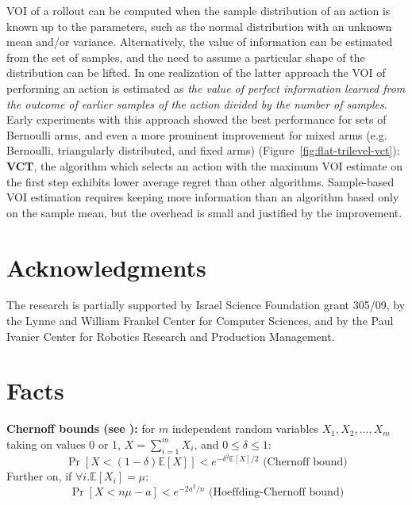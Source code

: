 \documentclass{article}
\newcommand {\IE} {\ensuremath {\mathbb{E}}}
\begin{document}
VOI of a rollout can be computed when the sample distribution of an
action is known up to the parameters, such as the normal distribution
with an unknown mean and/or variance. Alternatively, the value of
information can be estimated from the set of samples, and the need to
assume a particular shape of the distribution can be lifted. In one
realization of the latter approach the VOI of performing an action is
estimated as \emph{the value of perfect information learned from the outcome
of earlier samples of the action divided by the number of
samples}. Early experiments with this approach showed the best
performance for sets of Bernoulli arms, and even a more prominent
improvement for mixed arms (e.g. Bernoulli, triangularly distributed,
and fixed arms) (Figure~\ref{fig:flat-trilevel-vct}):
\textbf{VCT}, the algorithm which selects an action with the maximum VOI estimate on
the first step exhibits lower average regret than other algorithms.
Sample-based VOI estimation requires keeping more information than an
algorithm based only on the sample
mean, but the overhead is small and justified by the improvement.

\section*{Acknowledgments}

The research is partially supported by Israel
Science Foundation grant 305/09, by the Lynne and William Frankel
Center for Computer Sciences, and by the Paul Ivanier Center for
Robotics Research and Production Management.

\clearpage
\appendix

\section{Facts}

{\bf Chernoff bounds (see \cite{Hagerup.chernoff}):} for $m$ independent random variables $X_1, X_2, ..., X_m$
taking on values 0 or 1, $X=\sum_{i=1}^m X_i$, and $0\le\delta\le 1$:
\begin{equation}
\Pr[X < (1-\delta)\IE[X]] < e^{-\delta^2\IE[X]/2} \mbox{ (Chernoff bound)}
\label{eq:chernoff-bound}
\end{equation}
Further on, if $\forall i. \IE[X_i]=\mu$:
\begin{equation}
\Pr[X < n\mu-a] <  e^{-2a^2/n}
\label{eq:chernoff-hoeffding-bound} \mbox{ (Hoeffding-Chernoff bound)}
\end{equation}
\end{document}
